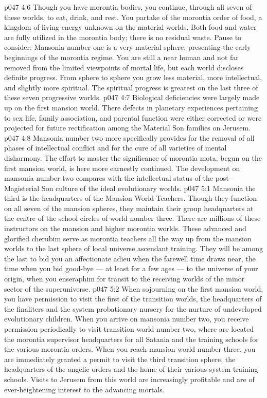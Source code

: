 \vs p047 4:6 Though you have morontia bodies, you continue, through all seven of these worlds, to eat, drink, and rest. You partake of the morontia order of food, a kingdom of living energy unknown on the material worlds. Both food and water are fully utilized in the morontia body; there is no residual waste. Pause to consider: Mansonia number one is a very material sphere, presenting the early beginnings of the morontia regime. You are still a near human and not far removed from the limited viewpoints of mortal life, but each world discloses definite progress. From sphere to sphere you grow less material, more intellectual, and slightly more spiritual. The spiritual progress is greatest on the last three of these seven progressive worlds.
\vs p047 4:7 Biological deficiencies were largely made up on the first mansion world. There defects in planetary experiences pertaining to sex life, family association, and parental function were either corrected or were projected for future rectification among the Material Son families on Jerusem.
\vs p047 4:8 Mansonia number two more specifically provides for the removal of all phases of intellectual conflict and for the cure of all varieties of mental disharmony. The effort to master the significance of morontia mota, begun on the first mansion world, is here more earnestly continued. The development on mansonia number two compares with the intellectual status of the post\hyp{}Magisterial Son culture of the ideal evolutionary worlds.
\vs p047 5:1 Mansonia the third is the headquarters of the Mansion World Teachers. Though they function on all seven of the mansion spheres, they maintain their group headquarters at the centre of the school circles of world number three. There are millions of these instructors on the mansion and higher morontia worlds. These advanced and glorified cherubim serve as morontia teachers all the way up from the mansion worlds to the last sphere of local universe ascendant training. They will be among the last to bid you an affectionate adieu when the farewell time draws near, the time when you bid good\hyp{}bye --- at least for a few ages --- to the universe of your origin, when you enseraphim for transit to the receiving worlds of the minor sector of the superuniverse.
\vs p047 5:2 When sojourning on the first mansion world, you have permission to visit the first of the transition worlds, the headquarters of the finaliters and the system probationary nursery for the nurture of undeveloped evolutionary children. When you arrive on mansonia number two, you receive permission periodically to visit transition world number two, where are located the morontia supervisor headquarters for all Satania and the training schools for the various morontia orders. When you reach mansion world number three, you are immediately granted a permit to visit the third transition sphere, the headquarters of the angelic orders and the home of their various system training schools. Visits to Jerusem from this world are increasingly profitable and are of ever\hyp{}heightening interest to the advancing mortals.
